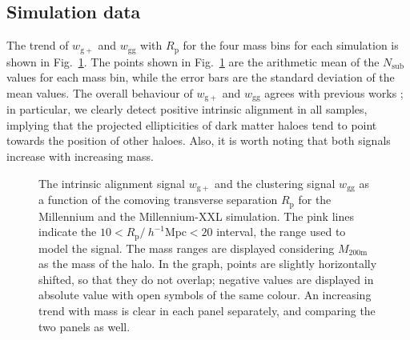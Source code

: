 \documentclass[a4paper,fleqn,usenatbib]{mnras}
\begin{document}
\subsection{Simulation data}
\label{subsec:simdatard}
The trend of $w_{\mathrm{g+}}$ and $w_{\mathrm{gg}}$ with $R_{\mathrm{p}}$ for the four mass bins for each simulation is shown in Fig.~\ref{fig:wgpwggrp}.%
The points shown in Fig.~\ref{fig:wgpwggrp} are the arithmetic mean of the $N_\mathrm{sub}$ values for each mass bin, while the error bars are the standard deviation of the mean values. The overall behaviour of $w_{\mathrm{g+}}$ and $w_{\mathrm{gg}}$ agrees with previous works \citep{Joachimietal2011, vanUitertJoachimi2017}; in particular, we clearly detect positive intrinsic alignment in all samples, implying that the projected ellipticities of dark matter haloes tend to point towards the position of other haloes. Also, it is worth noting that both signals increase with increasing mass.
\begin{figure}
	\centerline{
	}
	\centerline{
	}
	\caption{The intrinsic alignment signal $w_{\mathrm{g+}}$ and the clustering signal $w_{\mathrm{gg}}$ as a function of the comoving transverse separation $R_{\mathrm{p}}$ for \protect{} the Millennium and \protect{} the Millennium-XXL simulation. The pink lines indicate the $10 < R_{\mathrm{p}} / \ h^{-1}\mathrm{Mpc} < 20 $ interval, the range used to model the signal. The mass ranges are displayed considering $M_{\mathrm{200m}}$ as the mass of the halo.
	In the graph, points are slightly horizontally shifted, so that they do not overlap; negative values are displayed in absolute value with open symbols of the same colour. An increasing trend with mass is clear in each panel separately, and comparing the two panels as well.} %
	\label{fig:wgpwggrp}
\end{figure}
\end{document}
